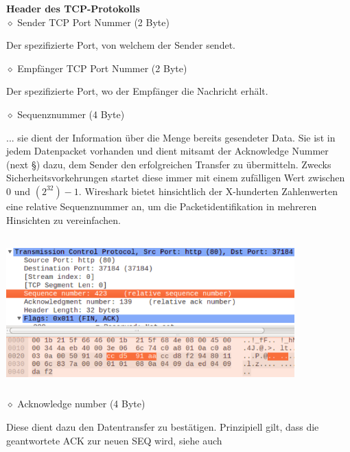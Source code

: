 \documentclass[11pt]{article}
\begin{document}
\begin{enumerate}[\thesection .1]
        \textbf{Header des TCP-Protokolls}\\
        $\diamond$ Sender TCP Port Nummer (2 Byte)
        \begin{addmargin}[1em]{1em}
            Der spezifizierte Port, von welchem der Sender sendet.
        \end{addmargin}

        $\diamond$ Empfänger TCP Port Nummer (2 Byte)
        \begin{addmargin}[1em]{1em}
            Der spezifizierte Port, wo der Empfänger die Nachricht erhält.
        \end{addmargin}

        $\diamond$ Sequenznummer (4 Byte)
        \begin{addmargin}[1em]{1em}
            ... sie dient der Information über die Menge bereits gesendeter Data. Sie ist in jedem Datenpacket vorhanden und
            dient mitsamt der Acknowledge Nummer (next §) dazu, dem Sender den erfolgreichen Transfer zu übermitteln. Zwecks Sicherheitsvorkehrungen startet diese immer
            mit einem zufälligen Wert zwischen 0 und $(2^32)-1$. Wireshark bietet hinsichtlich der X-hunderten Zahlenwerten eine relative
            Sequenznummer an, um die Packetidentifikation in mehreren Hinsichten zu vereinfachen.\\\\
            \includegraphics[width=30em, height=15em]{SequenceNumber.png}
        \end{addmargin}
        $\diamond$ Acknowledge number (4 Byte)
        \begin{addmargin}[1em]{1em}
            Diese dient dazu den Datentransfer zu bestätigen.
            Prinzipiell gilt, dass die geantwortete ACK zur neuen SEQ wird, siehe auch
            \begin{center}

\end{center}
\end{addmargin}
\end{enumerate}
\end{document}
